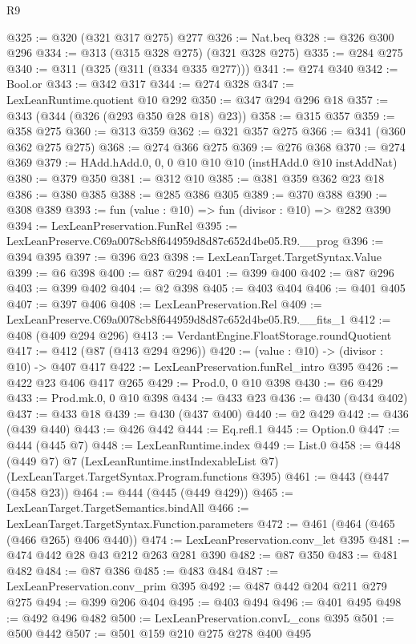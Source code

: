 \begin{lexlean}{R9}
\begin{coremodule}
@325 := @320 (@321 @317 @275) @277
@326 := Nat.beq
@328 := @326 @300 @296
@334 := @313 (@315 @328 @275) (@321 @328 @275)
@335 := @284 @275
@340 := @311 (@325 (@311 (@334 @335 @277)))
@341 := @274 @340
@342 := Bool.or
@343 := @342 @317
@344 := @274 @328
@347 := LexLeanRuntime.quotient @10 @292
@350 := @347 @294 @296 @18
@357 := @343 (@344 (@326 (@293 @350 @28 @18) @23))
@358 := @315 @357
@359 := @358 @275
@360 := @313 @359
@362 := @321 @357 @275
@366 := @341 (@360 @362 @275 @275)
@368 := @274 @366 @275
@369 := @276 @368
@370 := @274 @369
@379 := HAdd.hAdd.{0, 0, 0} @10 @10 @10 (instHAdd.{0} @10 instAddNat)
@380 := @379 @350
@381 := @312 @10
@385 := @381 @359 @362 @23 @18
@386 := @380 @385
@388 := @285 @386 @305
@389 := @370 @388
@390 := @308 @389
@393 := fun (value : @10) => fun (divisor : @10) => @282 @390
@394 := LexLeanPreservation.FunRel
@395 := LexLeanPreserve.C69a0078cb8f644959d8d87c652d4be05.R9.__prog
@396 := @394 @395
@397 := @396 @23
@398 := LexLeanTarget.TargetSyntax.Value
@399 := @6 @398
@400 := @87 @294
@401 := @399 @400
@402 := @87 @296
@403 := @399 @402
@404 := @2 @398
@405 := @403 @404
@406 := @401 @405
@407 := @397 @406
@408 := LexLeanPreservation.Rel
@409 := LexLeanPreserve.C69a0078cb8f644959d8d87c652d4be05.R9.__fits_1
@412 := @408 (@409 @294 @296)
@413 := VerdantEngine.FloatStorage.roundQuotient
@417 := @412 (@87 (@413 @294 @296))
@420 := (value : @10) -> (divisor : @10) -> @407 @417
@422 := LexLeanPreservation.funRel_intro @395
@426 := @422 @23 @406 @417 @265
@429 := Prod.{0, 0} @10 @398
@430 := @6 @429
@433 := Prod.mk.{0, 0} @10 @398
@434 := @433 @23
@436 := @430 (@434 @402)
@437 := @433 @18
@439 := @430 (@437 @400)
@440 := @2 @429
@442 := @436 (@439 @440)
@443 := @426 @442
@444 := Eq.refl.{1}
@445 := Option.{0}
@447 := @444 (@445 @7)
@448 := LexLeanRuntime.index
@449 := List.{0}
@458 := @448
    (@449 @7)
    @7
    (LexLeanRuntime.instIndexableList @7)
    (LexLeanTarget.TargetSyntax.Program.functions @395)
@461 := @443 (@447 (@458 @23))
@464 := @444 (@445 (@449 @429))
@465 := LexLeanTarget.TargetSemantics.bindAll
@466 := LexLeanTarget.TargetSyntax.Function.parameters
@472 := @461 (@464 (@465 (@466 @265) @406 @440))
@474 := LexLeanPreservation.conv_let @395
@481 := @474 @442 @28 @43 @212 @263 @281 @390
@482 := @87 @350
@483 := @481 @482
@484 := @87 @386
@485 := @483 @484
@487 := LexLeanPreservation.conv_prim @395
@492 := @487 @442 @204 @211 @279 @275
@494 := @399 @206 @404
@495 := @403 @494
@496 := @401 @495
@498 := @492 @496 @482
@500 := LexLeanPreservation.convL_cons @395
@501 := @500 @442
@507 := @501 @159 @210 @275 @278 @400 @495

\end{coremodule}
\end{lexlean}
